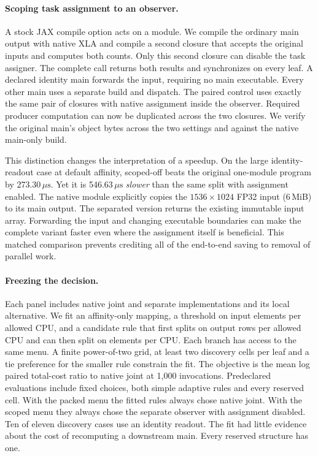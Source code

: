 \documentclass[sigplan,10pt,review,anonymous,nonacm]{acmart}
\newcommand{\us}{\ensuremath{\,\mu\mathrm{s}}}
\begin{document}
\paragraph{Scoping task assignment to an observer.}
A stock JAX compile option acts on a module. We compile the ordinary main output with native XLA and compile a second closure that accepts the original inputs and computes both counts. Only this second closure can disable the task assigner. The complete call returns both results and synchronizes on every leaf. A declared identity main forwards the input, requiring no main executable. Every other main uses a separate build and dispatch. The paired control uses exactly the same pair of closures with native assignment inside the observer. Required producer computation can now be duplicated across the two closures. We verify the original main's object bytes across the two settings and against the native main-only build.

This distinction changes the interpretation of a speedup. On the large identity-readout case at default affinity, scoped-off beats the original one-module program by 273.30\us{}. Yet it is 546.63\us{} \emph{slower} than the same split with assignment enabled. The native module explicitly copies the $1536\times1024$ FP32 input (6\,MiB) to its main output. The separated version returns the existing immutable input array. Forwarding the input and changing executable boundaries can make the complete variant faster even where the assignment itself is beneficial. This matched comparison prevents crediting all of the end-to-end saving to removal of parallel work.

\paragraph{Freezing the decision.}
Each panel includes native joint and separate implementations and its local alternative. We fit an affinity-only mapping, a threshold on input elements per allowed CPU, and a candidate rule that first splits on output rows per allowed CPU and can then split on elements per CPU. Each branch has access to the same menu. A finite power-of-two grid, at least two discovery cells per leaf and a tie preference for the smaller rule constrain the fit. The objective is the mean log paired total-cost ratio to native joint at 1,000 invocations. Predeclared evaluations include fixed choices, both simple adaptive rules and every reserved cell. With the packed menu the fitted rules always chose native joint. With the scoped menu they always chose the separate observer with assignment disabled. Ten of eleven discovery cases use an identity readout. The fit had little evidence about the cost of recomputing a downstream main. Every reserved structure has one.
\end{document}
